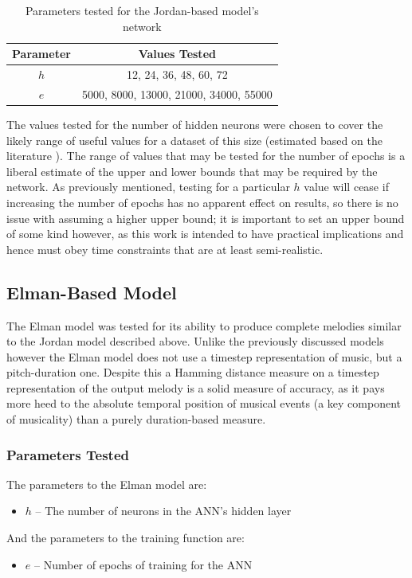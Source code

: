 \documentclass[ author={Stephen Livermore-Tozer},
				supervisor={Dr. Peter Flach},
				degree={MEng},
				title={Algorithmic Co-composition Using Machine Learning},
				subtitle={},
				type={research},
				year={2016} ]{dissertation}
\begin{document}
	\begin{table}[h]
		\begin{center}
			\begin{tabular}{cc}
				\toprule
				Parameter & Values Tested\\
				\hline
				$h$ & 12, 24, 36, 48, 60, 72\\
				$e$ & 5000, 8000, 13000, 21000, 34000, 55000\\
				\bottomrule
			\end{tabular}
		\end{center}
		\caption{Parameters tested for the Jordan-based model's network}
		\label{tab:jordan-net-parameters}
	\end{table}
	
	The values tested for the number of hidden neurons were chosen to cover the likely range of useful values for a dataset of this size (estimated based on the literature \cite{todd1989connectionist}). The range of values that may be tested for the number of epochs is a liberal estimate of the upper and lower bounds that may be required by the network. As previously mentioned, testing for a particular $h$ value will cease if increasing the number of epochs has no apparent effect on results, so there is no issue with assuming a higher upper bound; it is important to set an upper bound of some kind however, as this work is intended to have practical implications and hence must obey time constraints that are at least semi-realistic.
	
	\subsection{Elman-Based Model}
	
	The Elman model was tested for its ability to produce complete melodies similar to the Jordan model described above. Unlike the previously discussed models however the Elman model does not use a timestep representation of music, but a pitch-duration one. Despite this a Hamming distance measure on a timestep representation of the output melody is a solid measure of accuracy, as it pays more heed to the absolute temporal position of musical events (a key component of musicality) than a purely duration-based measure.
	
	\subsubsection{Parameters Tested}
	
	The parameters to the Elman model are:
	\begin{itemize}
		\item $h$ -- The number of neurons in the ANN's hidden layer
	\end{itemize}
	And the parameters to the training function are:
	\begin{itemize}
		\item $e$ -- Number of epochs of training for the ANN
	\end{itemize}
	
\end{document}

